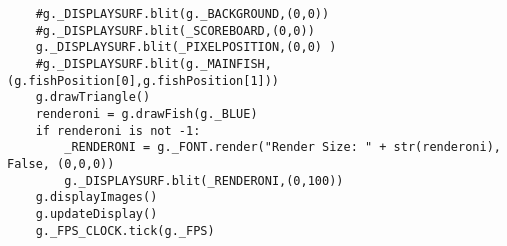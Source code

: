 \begin{verbatim}
    #g._DISPLAYSURF.blit(g._BACKGROUND,(0,0))
    #g._DISPLAYSURF.blit(_SCOREBOARD,(0,0))
    g._DISPLAYSURF.blit(_PIXELPOSITION,(0,0) )
    #g._DISPLAYSURF.blit(g._MAINFISH,(g.fishPosition[0],g.fishPosition[1]))
    g.drawTriangle()
    renderoni = g.drawFish(g._BLUE)
    if renderoni is not -1:
        _RENDERONI = g._FONT.render("Render Size: " + str(renderoni), False, (0,0,0))
        g._DISPLAYSURF.blit(_RENDERONI,(0,100))
    g.displayImages()
    g.updateDisplay()
    g._FPS_CLOCK.tick(g._FPS)

\end{verbatim}
